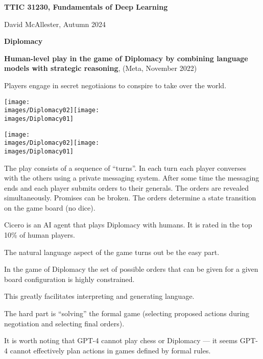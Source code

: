




{\Huge

  \centerline{\bf TTIC 31230, Fundamentals of Deep Learning}
  \bigskip
  \centerline{David McAllester, Autumn 2024}


  \vfill
  \centerline{\bf Diplomacy}
  \vfill
  \vfill


{\bf Human-level play in the game of Diplomacy by combining language models with strategic reasoning}, (Meta, November 2022)

\vfill
Players engage in secret negotiaions to conspire to take over the world.

\vfill
\centerline{\texttt{[image: \\images/Diplomacy02]}\hfill\texttt{[image: \\images/Diplomacy01]}}


\vfill
\centerline{\texttt{[image: \\images/Diplomacy02]}\hspace{4em}\texttt{[image: \\images/Diplomacy01]}}

\vfill
The play consists of a sequence of ``turns''.  In each turn each player converses with the others using a private messaging system.  After some time the messaging ends and each player submits orders to their generals.  The orders are revealed simultaneously. Promises can be broken.  The orders determine a state transition on the game board (no dice).



Cicero is an AI agent that plays Diplomacy with humans.  It is rated in the top 10\% of human players.


The natural language aspect of the game turns out be the easy part.

\vfill
In the game of Diplomacy the set of possible orders that can be given for a given board configuration is highly constrained.

\vfill
This greatly facilitates interpreting and generating language.

\vfill
The hard part is ``solving'' the formal game (selecting proposed actions during negotiation and selecting final orders).


It is worth noting that GPT-4 cannot play chess or Diplomacy --- it seems GPT-4 cannot effectively plan actions in games defined by formal rules.

}
